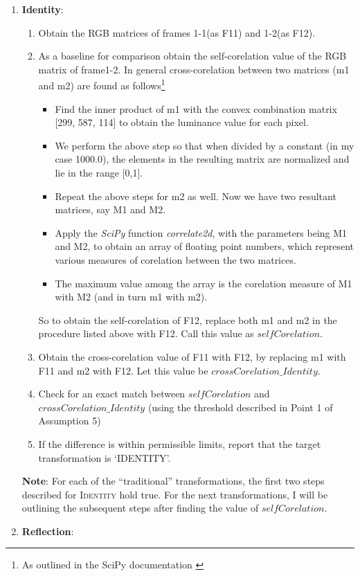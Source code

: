 \documentclass[10pt, letter]{article}
\begin{document}
\begin{enumerate}
\item \textbf{Identity}: 
\begin{enumerate}
\item Obtain the RGB matrices of frames 1-1(as F11) and 1-2(as F12). 
\item As a baseline for comparison obtain the self-corelation value of the RGB matrix of frame1-2. In general cross-corelation between two matrices (m1 and m2) are found as follows\footnote{As outlined in the SciPy documentation \cite{web}}
	\begin{itemize}
		\item Find the inner product of m1 with the convex combination matrix \cite{math} [299, 587, 114] to obtain the luminance value for each pixel.
		\item We perform the above step so that when divided by a constant (in my case 1000.0), the elements in the resulting matrix are normalized and lie in the range [0,1].
		\item Repeat the above steps for m2 as well. Now we have two resultant matrices, say M1 and M2.
		\item Apply the \emph{SciPy} function \cite{web} \emph{correlate2d}, with the parameters being M1 and M2, to obtain an array of floating point numbers, which represent various measures of corelation between the two matrices.
		\item The maximum value among the array is the corelation measure of M1 with M2 (and in turn m1 with m2).
	\end{itemize}
So to obtain the self-corelation of F12, replace both m1 and m2 in the procedure listed above with F12. Call this value as $selfCorelation$.
\item Obtain the cross-corelation value of F11 with F12, by replacing m1 with F11 and m2 with F12. Let this value be $crossCorelation\_Identity$.
\item Check for an exact match between $selfCorelation$ and $crossCorelation\_Identity$ (using the threshold described in Point 1 of Assumption 5)
\item If the difference is within permissible limits, report that the target transformation is `IDENTITY'.
\end{enumerate}
\textbf{Note}: For each of the ``traditional'' transformations, the first two steps described for \textsc{Identity} hold true. For the next transformations, I will be outlining the subsequent steps after finding the value of $selfCorelation$.
\item \textbf{Reflection}:

\end{enumerate}
\end{document}

